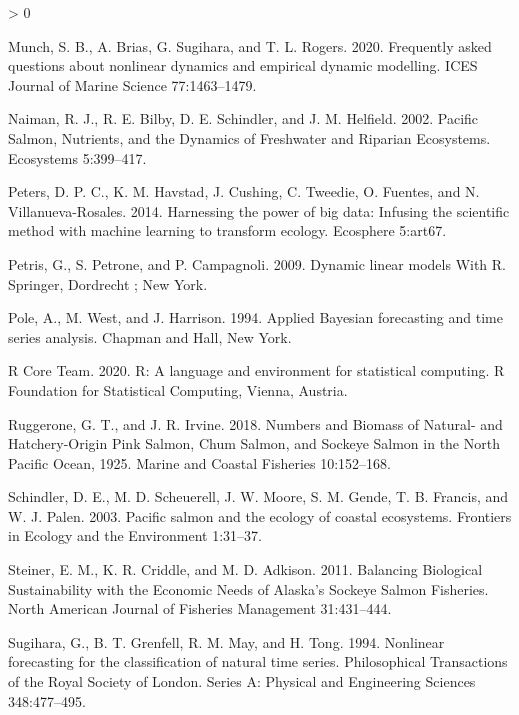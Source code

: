 \documentclass[
]{article}
\newlength{\cslhangindent}
\newenvironment{CSLReferences}[2] %
 {%
  \setlength{\parindent}{0pt}
  \ifodd #1 \everypar{\setlength{\hangindent}{\cslhangindent}}\ignorespaces\fi
  \ifnum #2 > 0
  \setlength{\parskip}{#2\baselineskip}
  \fi
 }%
 {}
\begin{document}
\begin{CSLReferences}{1}{0}
\leavevmode\hypertarget{ref-munch2020}{}%
Munch, S. B., A. Brias, G. Sugihara, and T. L. Rogers. 2020. Frequently asked questions about nonlinear dynamics and empirical dynamic modelling. ICES Journal of Marine Science 77:1463--1479.

\leavevmode\hypertarget{ref-naiman2002}{}%
Naiman, R. J., R. E. Bilby, D. E. Schindler, and J. M. Helfield. 2002. Pacific {Salmon}, {Nutrients}, and the {Dynamics} of {Freshwater} and {Riparian Ecosystems}. Ecosystems 5:399--417.

\leavevmode\hypertarget{ref-peters2014}{}%
Peters, D. P. C., K. M. Havstad, J. Cushing, C. Tweedie, O. Fuentes, and N. Villanueva-Rosales. 2014. Harnessing the power of big data: Infusing the scientific method with machine learning to transform ecology. Ecosphere 5:art67.

\leavevmode\hypertarget{ref-petris2009}{}%
Petris, G., S. Petrone, and P. Campagnoli. 2009. Dynamic linear models {With R}. {Springer}, {Dordrecht ; New York}.

\leavevmode\hypertarget{ref-pole1994}{}%
Pole, A., M. West, and J. Harrison. 1994. Applied {Bayesian} forecasting and time series analysis. {Chapman and Hall}, {New York}.

\leavevmode\hypertarget{ref-rcoreteam2020}{}%
R Core Team. 2020. R: A language and environment for statistical computing. R Foundation for Statistical Computing, Vienna, Austria.

\leavevmode\hypertarget{ref-ruggerone2018}{}%
Ruggerone, G. T., and J. R. Irvine. 2018. Numbers and {Biomass} of {Natural}- and {Hatchery}-{Origin Pink Salmon}, {Chum Salmon}, and {Sockeye Salmon} in the {North Pacific Ocean}, 1925{}. Marine and Coastal Fisheries 10:152--168.

\leavevmode\hypertarget{ref-schindler2003}{}%
Schindler, D. E., M. D. Scheuerell, J. W. Moore, S. M. Gende, T. B. Francis, and W. J. Palen. 2003. Pacific salmon and the ecology of coastal ecosystems. Frontiers in Ecology and the Environment 1:31--37.

\leavevmode\hypertarget{ref-steiner2011}{}%
Steiner, E. M., K. R. Criddle, and M. D. Adkison. 2011. Balancing {Biological Sustainability} with the {Economic Needs} of {Alaska}'s {Sockeye Salmon Fisheries}. North American Journal of Fisheries Management 31:431--444.

\leavevmode\hypertarget{ref-sugihara1994}{}%
Sugihara, G., B. T. Grenfell, R. M. May, and H. Tong. 1994. Nonlinear forecasting for the classification of natural time series. Philosophical Transactions of the Royal Society of London. Series A: Physical and Engineering Sciences 348:477--495.


\end{CSLReferences}
\end{document}
